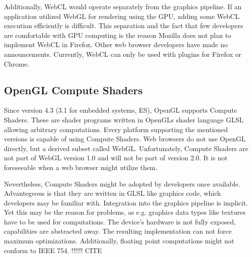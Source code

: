 Additionally, WebCL would operate separately from the graphics pipeline. If an application utilized WebGL for rendering using the GPU, adding some WebCL execution efficiently is difficult. This separation and the fact that few developers are comfortable with GPU computing is the reason Mozilla does not plan to implement WebCL in Firefox. \cite{webcl_ff} Other web browser developers have made no announcements. Currently, WebCL can only be used with plugins for Firefox or Chrome.


\subsection{OpenGL Compute Shaders}

Since version 4.3 (3.1 for embedded systems, ES), OpenGL supports Compute Shaders. These are shader programs written in OpenGLs shader language GLSL allowing arbitrary computations. Every platform supporting the mentioned versions is capable of using Compute Shaders. Web browsers do not use OpenGL directly, but a derived subset called WebGL. Unfortunately, Compute Shaders are not part of WebGL version 1.0 and will not be part of version 2.0. It is not foreseeable when a web browser might utilize them.

Nevertheless, Compute Shaders might be adopted by developers once available. Advantegeous is that they are written in GLSL like graphics code, which developers may be familiar with. Integration into the graphics pipeline is implicit. Yet this may be the reason for problems, as e.g. graphics data types like textures have to be used for computations. The device's hardware is not fully exposed, capabilities are abstracted away. The resulting implementation can not force maximum optimizations. Additionally, floating point computations might not conform to IEEE 754. !!!!!! CITE
